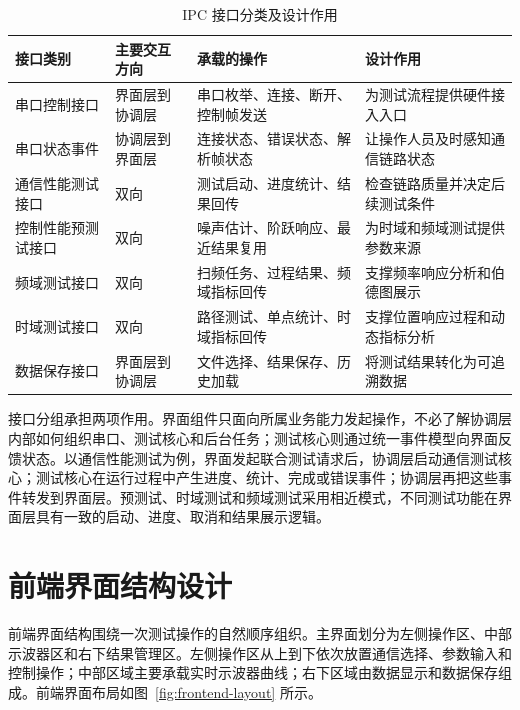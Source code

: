 \begin{table}[htb]
  \centering
  \caption{IPC 接口分类及设计作用}
  \label{tab:ipc-classification}
  \small
  \begingroup
  \setlength{\tabcolsep}{3pt}
  \begin{tabular}{@{}>{\raggedright\arraybackslash}p{}>{\raggedright\arraybackslash}p{}>{\raggedright\arraybackslash}p{}>{\raggedright\arraybackslash}p{}@{}}
    \toprule
    接口类别 & 主要交互方向 & 承载的操作 & 设计作用 \\
    \midrule
    串口控制接口 & 界面层到协调层 & 串口枚举、连接、断开、控制帧发送 & 为测试流程提供硬件接入入口 \\
    串口状态事件 & 协调层到界面层 & 连接状态、错误状态、解析帧状态 & 让操作人员及时感知通信链路状态 \\
    通信性能测试接口 & 双向 & 测试启动、进度统计、结果回传 & 检查链路质量并决定后续测试条件 \\
    控制性能预测试接口 & 双向 & 噪声估计、阶跃响应、最近结果复用 & 为时域和频域测试提供参数来源 \\
    频域测试接口 & 双向 & 扫频任务、过程结果、频域指标回传 & 支撑频率响应分析和伯德图展示 \\
    时域测试接口 & 双向 & 路径测试、单点统计、时域指标回传 & 支撑位置响应过程和动态指标分析 \\
    数据保存接口 & 界面层到协调层 & 文件选择、结果保存、历史加载 & 将测试结果转化为可追溯数据 \\
    \bottomrule
  \end{tabular}
  \endgroup
\end{table}

接口分组承担两项作用。界面组件只面向所属业务能力发起操作，不必了解协调层内部如何组织串口、测试核心和后台任务；测试核心则通过统一事件模型向界面反馈状态。以通信性能测试为例，界面发起联合测试请求后，协调层启动通信测试核心；测试核心在运行过程中产生进度、统计、完成或错误事件；协调层再把这些事件转发到界面层。预测试、时域测试和频域测试采用相近模式，不同测试功能在界面层具有一致的启动、进度、取消和结果展示逻辑。

\section{前端界面结构设计}

前端界面结构围绕一次测试操作的自然顺序组织。主界面划分为左侧操作区、中部示波器区和右下结果管理区。左侧操作区从上到下依次放置通信选择、参数输入和控制操作；中部区域主要承载实时示波器曲线；右下区域由数据显示和数据保存组成。前端界面布局如图~\ref{fig:frontend-layout} 所示。

